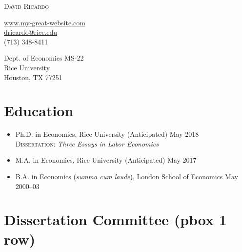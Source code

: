 \documentclass{article}[12]
\makeatletter
\newcommand{\email}[1]{\href{mailto:#1}{#1}}
\newcommand{\myname}{David Ricardo}
\newcommand{\myemail}{dricardo@rice.edu}
\newcommand{\mywebsite}{http://www.my-great-website.com}
\newcommand{\mywebsiteNoHttp}{www.my-great-website.com}
\newcommand{\myphone}{(713) 348-8411}
\newcommand{\myaddress}{
Dept. of Economics MS-22 \\ 
Rice University \\ 
Houston, TX 77251}
\makeatother
\begin{document}
\thispagestyle{empty}

\begin{center}
{\huge\scshape\myname}
\end{center}

\vspace{3em}

\begin{minipage}[t]{0.48\textwidth}
    \href{\mywebsite}{\mywebsiteNoHttp} \\
    \email{\myemail}  \\ 
    \myphone 
\end{minipage}
\hfill
\begin{minipage}[t]{0.48\textwidth}
    \begin{flushright}
    \myaddress
    \end{flushright}
\end{minipage}


\section{Education}

\begin{itemize}[labelindent=-25pt,itemindent=-20pt,leftmargin=!]
    \item Ph.D. in Economics, Rice University  \hfill (Anticipated) May 2018  \\
    \textsc{Dissertation}: \emph{Three Essays in Labor Economics}

    \item M.A. in Economics, Rice University  \hfill (Anticipated) May 2017 

    \item B.A. in Economics (\emph{summa cum laude}), London School of Economics \hfill May 2000--03 
\end{itemize}

\section{Dissertation Committee (pbox 1 row)}
\end{document}
